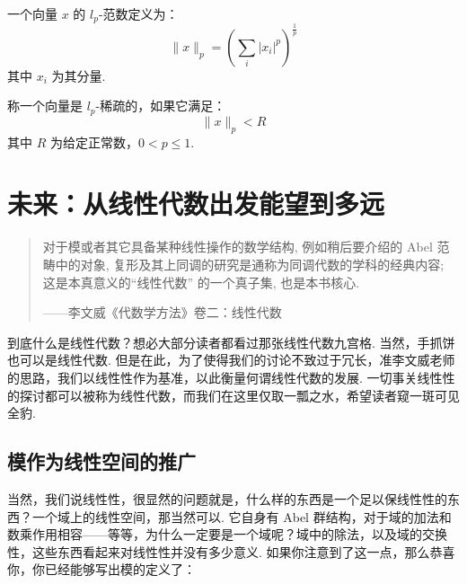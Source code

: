 \begin{definition}
    一个向量 $x$ 的 $l_p$-范数定义为：
    \[
    \lVert x \rVert_p = \left( \sum_{i}|x_i|^p \right)^{\frac{1}{p}}
    \]
    其中 $x_i$ 为其分量.
\end{definition}

\begin{definition}
    称一个向量是 $l_p$-稀疏的，如果它满足：
    \[
    \lVert x \rVert_p < R
    \]
    其中 $R$ 为给定正常数，$0 < p \leqslant 1$.
\end{definition}

\section{未来：从线性代数出发能望到多远}

\begin{quote}

\kaishu
对于模或者其它具备某种线性操作的数学结构, 例如稍后要介绍的 Abel 范畴中的对象, 复形及其上同调的研究是通称为同调代数的学科的经典内容; 这是本真意义的“线性代数” 的一个真子集, 也是本书核心.

\begin{flushright}
    \kaishu
    ——李文威《代数学方法》卷二：线性代数
\end{flushright}

\end{quote}

到底什么是线性代数？想必大部分读者都看过那张线性代数九宫格. 当然，手抓饼也可以是线性代数. 但是在此，为了使得我们的讨论不致过于冗长，准李文威老师的思路，我们以线性性作为基准，以此衡量何谓线性代数的发展. 一切事关线性性的探讨都可以被称为线性代数，而我们在这里仅取一瓢之水，希望读者窥一斑可见全豹.

\subsection{模作为线性空间的推广}

当然，我们说线性性，很显然的问题就是，什么样的东西是一个足以保线性性的东西？一个域上的线性空间，那当然可以. 它自身有 Abel 群结构，对于域的加法和数乘作用相容——等等，为什么一定要是一个域呢？域中的除法，以及域的交换性，这些东西看起来对线性性并没有多少意义. 如果你注意到了这一点，那么恭喜你，你已经能够写出模的定义了：

